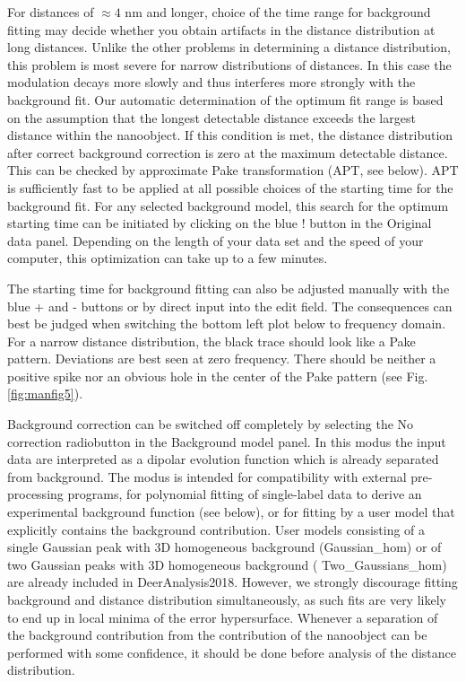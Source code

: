 \documentclass{article}
\begin{document}
For distances of $\approx4$ nm and longer, choice of the time range for background
fitting may decide whether you obtain artifacts in the distance distribution at
long distances. Unlike the other problems in determining a distance distribution,
this problem is most severe for narrow distributions of distances. In this case the
modulation decays more slowly and thus interferes more strongly with the background
fit. Our automatic determination of the optimum fit range is based on
the assumption that the longest detectable distance exceeds the largest distance
within the nanoobject. If this condition is met, the distance distribution after
correct background correction is zero at the maximum detectable distance. This
can be checked by approximate Pake transformation (APT, see below). APT is
sufficiently fast to be applied at all possible choices of the starting time for the
background fit. For any selected background model, this search for the optimum
starting time can be initiated by clicking on the blue {\ttfamily !} button in
the {\ttfamily Original data} panel. Depending on the length of your data set and the
speed of your computer, this optimization can take up to a few minutes.

The starting time for background fitting can also be adjusted manually with
the blue {\ttfamily +} and {\ttfamily -} buttons or by direct input into the edit field. The consequences can best be judged when switching the bottom left plot below to frequency
domain. For a narrow distance distribution, the black trace should look like
a Pake pattern. Deviations are best seen at zero frequency. There should be
neither a positive spike nor an obvious hole in the center of the Pake pattern
(see Fig. \ref{fig:manfig5}).

Background correction can be switched off completely by selecting the {\ttfamily No
correction} radiobutton in the {\ttfamily Background model} panel. In this modus the input data are interpreted as a dipolar evolution function which is already separated from background. The
modus is intended for compatibility with external pre-processing programs,
for polynomial fitting of single-label data to derive an experimental background
function (see below), or for fitting by a user model that explicitly contains the background contribution. User models consisting of a single Gaussian peak with 3D homogeneous background ({\ttfamily Gaussian\_hom}) or of two Gaussian peaks with 3D homogeneous background ({\ttfamily 
Two\_Gaussians\_hom}) are already included in DeerAnalysis2018. However, we strongly discourage fitting background and distance distribution simultaneously, as such fits are very likely to end up in local minima of the error hypersurface. Whenever a separation of the background contribution from the contribution of the nanoobject can be performed with some confidence, it should be done before analysis of the distance distribution.
\end{document}
